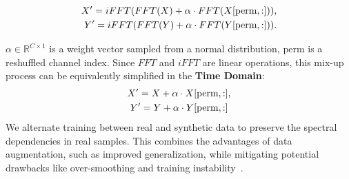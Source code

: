 \begin{align}
X' = iFFT(FFT(X) +\alpha \cdot FFT(X[\text{perm},:]))&,  \notag\\ 
Y' = iFFT(FFT(Y) +\alpha \cdot FFT(Y[\text{perm},:]))&.
\end{align}

$\alpha \in \mathbb{R}^{C \times 1}$ is a weight vector sampled from a normal distribution, $\text{perm}$ is a reshuffled channel index. Since $FFT$ and $iFFT$ are linear operations, this mix-up process can be equivalently simplified in the \textbf{Time Domain}:
\begin{align}
X' = X +\alpha \cdot X[\text{perm},:]&,  \notag\\
Y' = Y +\alpha \cdot Y[\text{perm},:]&
 \end{align}
We alternate training between real and synthetic data to preserve the spectral dependencies in real samples. This combines the advantages of data augmentation, such as improved generalization, while mitigating potential drawbacks like over-smoothing and training instability~\citep{ryu2024tf,alkhalifah2022tf}.











